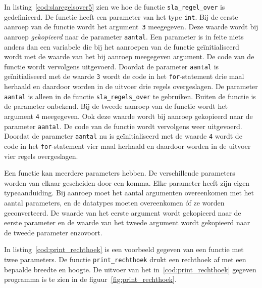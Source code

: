 
In listing~\ref{cod:slaregelsover5} zien we hoe de functie \texttt{sla\_regel\_over} is gedefinieerd.
De functie heeft een parameter van het type \texttt{int}.
Bij de eerste aanroep van de functie wordt het argument~\texttt{3} meegegeven.
Deze waarde wordt bij aanroep \textsl{gekopieerd} naar de parameter \texttt{aantal}.
Een parameter is in feite niets anders dan een variabele die bij het aanroepen van de functie geïnitialiseerd wordt met de waarde van het bij aanroep meegegeven argument.
De code van de functie wordt vervolgens uitgevoerd.
Doordat de parameter \texttt{aantal} is geïnitialiseerd met de waarde \texttt{3} wordt de code in het \texttt{for}-statement drie maal herhaald en daardoor worden in de uitvoer drie regels overgeslagen.
De parameter \texttt{aantal} is alleen in de functie \texttt{sla\_regels\_over} te gebruiken.
Buiten de functie is de parameter onbekend.  
Bij de tweede aanroep van de functie wordt het argument \texttt{4} meegegeven.
Ook deze waarde wordt bij aanroep gekopieerd naar de parameter \texttt{aantal}.
De code van de functie wordt vervolgens weer uitgevoerd.
Doordat de parameter \texttt{aantal} nu is geïnitialiseerd met de waarde \texttt{4} wordt de code in het \texttt{for}-statement vier maal herhaald en daardoor worden in de uitvoer vier regels overgeslagen.


Een functie kan meerdere parameters hebben. 
De verschillende parameters worden van elkaar gescheiden door een komma.
Elke parameter heeft zijn eigen typeaanduiding.
Bij aanroep moet het aantal argumenten overeenkomen met het aantal parameters, en de datatypes moeten overeenkomen óf ze worden geconverteerd.
De waarde van het eerste argument wordt gekopieerd naar de eerste parameter en de waarde van het tweede argument wordt gekopieerd naar de tweede parameter enzovoort.

In listing~\ref{cod:print_rechthoek} is een voorbeeld gegeven van een functie met twee parameters.
De functie \texttt{print\_rechthoek} drukt een rechthoek af met een bepaalde breedte en hoogte.
De uitvoer van het in~\ref{cod:print_rechthoek} gegeven programma is te zien in de figuur~\ref{fig:print_rechthoek}.


